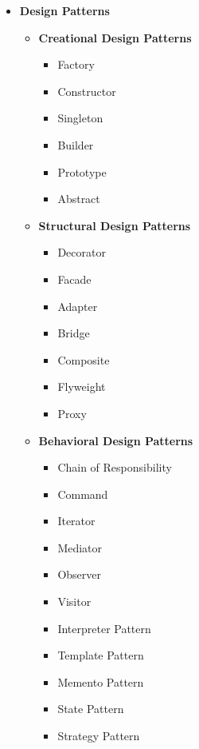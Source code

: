 \vspace{0.3cm}
\begin{itemize}
    \item \textbf{Design Patterns}
    \begin{itemize}

        \item \textbf{Creational Design Patterns}
        \begin{itemize}
            \item Factory
            \item Constructor
            \item Singleton
            \item Builder
            \item Prototype
            \item Abstract
        \end{itemize}

        \item \textbf{Structural Design Patterns}
        \begin{itemize}
            \item Decorator
            \item Facade
            \item Adapter
            \item Bridge
            \item Composite
            \item Flyweight
            \item Proxy
        \end{itemize}

        \item \textbf{Behavioral Design Patterns}
        \begin{itemize}
            \item Chain of Responsibility
            \item Command
            \item Iterator
            \item Mediator
            \item Observer
            \item Visitor
            \item Interpreter Pattern
            \item Template Pattern
            \item Memento Pattern
            \item State Pattern
            \item Strategy Pattern
        \end{itemize}

    \end{itemize}
\end{itemize}


